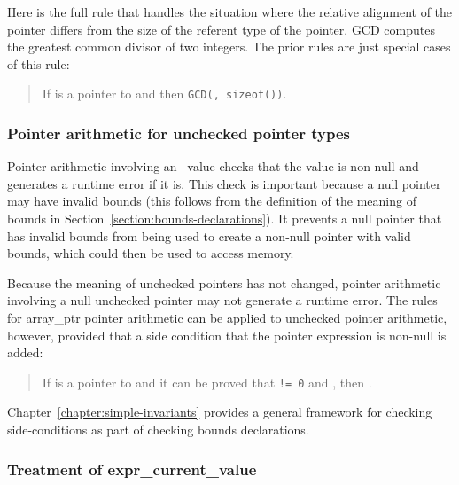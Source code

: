 Here is the full rule that handles the situation where the relative
alignment of the pointer differs from the size of the referent type of
the pointer. GCD computes the greatest common divisor of two integers.
The prior rules are just special cases of this rule:

\begin{quote}
If  is a pointer to  and 
            {
                       {}
                       {}}
then 
                 {
                            {}
                            {\texttt{GCD(, sizeof())}}}.
\end{quote}

\subsubsection{Pointer arithmetic for unchecked pointer types}

Pointer arithmetic involving an \arrayptr\ value checks that
the value is non-null and generates a runtime error if it is. This check
is important because a null pointer may have invalid bounds (this
follows from the definition of the meaning of bounds in 
Section~\ref{section:bounds-declarations}). It
prevents a null pointer that has invalid bounds from being used to create a
non-null pointer with valid bounds, which could then be used to access
memory.

Because the meaning of unchecked pointers has not changed, pointer
arithmetic involving a null unchecked pointer may not generate a runtime
error. The rules for array\_ptr pointer arithmetic can be applied to
unchecked pointer arithmetic, however, provided that a side condition that
the pointer expression is non-null is added:

\begin{quote}
If  is a pointer to  and it can be proved that
 \texttt{!= 0} and 
, then
.
\end{quote}

Chapter~\ref{chapter:simple-invariants}
provides a general framework for checking side-conditions as
part of checking bounds declarations.

\subsubsection{Treatment of expr\_current\_value}

